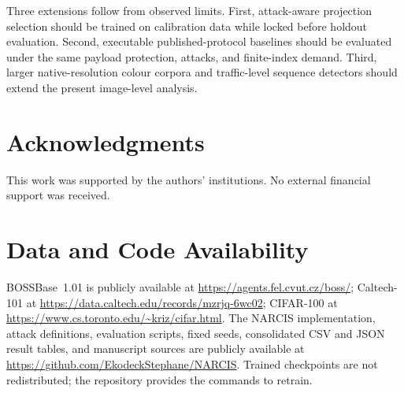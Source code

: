 \documentclass[10pt,journal]{IEEEtran}
\newcommand{\method}{NARCIS\xspace}
\begin{document}
Three extensions follow from observed limits. First, attack-aware
projection selection should be trained on calibration data while locked
before holdout evaluation. Second, executable published-protocol
baselines should be evaluated under the same payload protection,
attacks, and finite-index demand. Third, larger native-resolution
colour corpora and traffic-level sequence detectors should extend the
present image-level analysis.

\section*{Acknowledgments}

This work was supported by the authors' institutions. No external
financial support was received.

\appendix

\section*{Data and Code Availability}

BOSSBase~1.01 is publicly available at \url{https://agents.fel.cvut.cz/boss/};
Caltech-101 at \url{https://data.caltech.edu/records/mzrjq-6wc02};
CIFAR-100 at \url{https://www.cs.toronto.edu/~kriz/cifar.html}.
The \method implementation, attack definitions, evaluation scripts,
fixed seeds, consolidated CSV and JSON result tables, and manuscript
sources are publicly available at
\url{https://github.com/EkodeckStephane/NARCIS}. Trained checkpoints
are not redistributed; the repository provides the commands to retrain.



\end{document}
